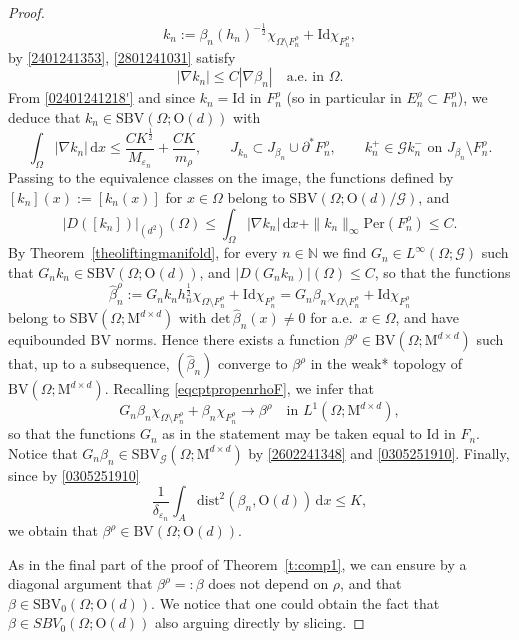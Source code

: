 \documentclass[a4paper,reqno]{amsart}
\newcommand\N{\mathbb{N}}
\newcommand{\BV}{\mathrm{BV}}
\newcommand{\SBV}{\mathrm{SBV}}
\newcommand{\SBVG}{\mathrm{SBV}_{\mathcal{G}}}
\newcommand\dist{{\mathrm{dist}}}
\newcommand\Id{{\mathrm{Id}}}
\newcommand{\Per}{\mathrm{Per}}
\theoremstyle{remark}
\newcommand\dx{{\,\mathrm{d}x}}
\newcommand{\sm}{\setminus}
\newcommand{\G}{\mathcal{G}}
\newcommand{\On}{\mathrm{O}(d)}
\newcommand{\Mno}{\mathrm{M}^{d\times d}}
\numberwithin{equation}{section}
\begin{document}
\begin{proof}
\begin{equation}
		k_n:=\beta_n(h_n)^{-\frac{1}{2}}\chi_{\Omega\sm F_n^\rho}+ \Id \chi_{F_n^\rho},
	\end{equation} 
by \eqref{2401241353}, \eqref{2801241031} satisfy
	\begin{equation*}\label{2801241258}
		|\nabla  k_n|\leq C |\nabla  \beta_n| \quad\text{a.e.\ in }\Omega.
	\end{equation*}
 From  \eqref{02401241218'}  and since $k_n=\mathrm{Id}$ in $F_n^\rho$ (so in particular in $E_n^\rho\subset F_n^\rho$),
we deduce
that $k_n\in \SBV(\Omega; \On)$ with
	\begin{equation}\label{2801241247}
\int_\Omega	|\nabla k_n | \dx \leq
\frac{C K^{\frac 12}}{M_{\varepsilon_n}}+\frac{C K}{m_\rho},
\qquad J_{ k_n}\subset J_{\beta_n}\cup \partial^* F_n^\rho, \qquad
k_n^+\in \G  k_n^- \text{ on }J_{\beta_n}
\setminus F_n^\rho.
	\end{equation}
	Passing to the equivalence classes on the image, the functions defined by $[k_n](x):=[k_n(x)]$ for $x\in\Omega$ belong to $\SBV(\Omega; \On/\G)$, and
	\[
|D([k_n])|_{(d^2)}(\Omega)\leq \int_\Omega	|\nabla k_n | \dx+ \|k_n\|_\infty \Per(F_n^\rho)\leq C.
	\]
By Theorem~\ref{theoliftingmanifold}, for every $n\in\N$ we find $G_n\in L^\infty(\Omega;\G)$ such that
$G_n k_n \in \SBV(\Omega; \On)$, and
$|D(G_n k_n)|(\Omega)\leq C$, so that the functions
	\begin{equation}\label{2602241348}
		\widehat{\beta}^\rho_n:=G_n k_n h_n^{\frac{1}{2}} \chi_{\Omega\sm F_n^\rho}+\Id \chi_{F_n^\rho}=
		G_n \beta_n \chi_{\Omega\sm F_n^\rho}+\Id \chi_{F_n^\rho}
	\end{equation}
	belong to  $\SBV(\Omega; \Mno)$ with $\mathrm{det}\,\widehat{\beta}_n(x) \neq 0$ 
	for a.e.\ $x \in \Omega$,  and have equibounded $\BV$ norms.
	Hence 
	there exists a function $\beta^\rho\in \BV(\Omega; \Mno)$ such that, up to a subsequence,
	$(\widehat{\beta}_n) $ converge to $\beta^\rho$ in the weak* topology of $\BV(\Omega; \Mno)$.
Recalling \eqref{eqcptpropenrhoF}, we infer that
\begin{equation}\label{f: endc2}
		G_n \beta_n \chi_{\Omega\sm F_n^\rho}+\beta_n  \chi_{ F_n^\rho}\to \beta^\rho \quad\text{in }L^1(\Omega; \Mno),
	\end{equation}
	so that the functions $G_n$ as in the statement may be taken equal to $\Id$ in $F_n$. Notice that $G_n \beta_n \in \SBVG(\Omega; \Mno)$ by \eqref{2602241348} and \eqref{0305251910}. 
	Finally, since by \eqref{0305251910}
	\[
	\frac{1}{\delta_{\varepsilon_n}} \int_A \dist^2(\beta_n, \On) \dx \leq K,
	\]
	we obtain that  $\beta^\rho\in \BV(\Omega; \On)$.

	As in the final part of the proof of Theorem~\ref{t:comp1}, we can ensure by a diagonal argument that $\beta^\rho=:\beta$ does not depend on $\rho$, and that $\beta \in \SBV_0(\Omega;\On)$.
	We notice that one could obtain the fact that $\beta \in SBV_0(\Omega;\On)$ also arguing directly by slicing.
\end{proof}
\end{document}
